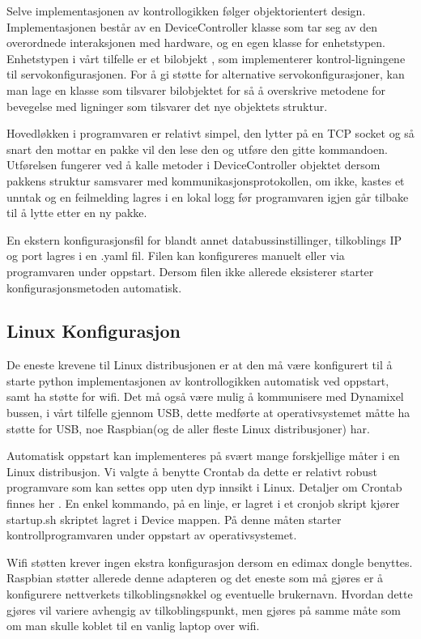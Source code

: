 \documentclass[12pt]{report}
\begin{document}
Selve implementasjonen av kontrollogikken følger objektorientert design. Implementasjonen består av en DeviceController klasse som tar seg av den overordnede interaksjonen med hardware, og en egen klasse for enhetstypen. Enhetstypen i vårt tilfelle er et bilobjekt , som implementerer kontrol-ligningene til servokonfigurasjonen. For å gi støtte for alternative servokonfigurasjoner, kan man lage en klasse som tilsvarer bilobjektet for så å overskrive metodene for bevegelse med ligninger som tilsvarer det nye objektets struktur.

Hovedløkken i programvaren er relativt simpel, den lytter på en TCP socket og så snart den mottar en pakke vil den lese den og utføre den gitte kommandoen. Utførelsen fungerer ved å kalle metoder i DeviceController objektet dersom pakkens struktur samsvarer med kommunikasjonsprotokollen, om ikke, kastes et unntak og en feilmelding lagres i en lokal logg før programvaren igjen går tilbake til å lytte etter en ny pakke.

En ekstern konfigurasjonsfil for blandt annet databussinstillinger, tilkoblings IP  og port lagres i en .yaml fil. Filen kan konfigureres manuelt eller via programvaren under oppstart. Dersom filen ikke allerede eksisterer starter konfigurasjonsmetoden automatisk.

\subsection{Linux Konfigurasjon}
De eneste krevene til Linux distribusjonen er at den må være konfigurert til å starte python implementasjonen av kontrollogikken automatisk ved oppstart, samt ha støtte for wifi. Det må også være mulig å kommunisere med Dynamixel bussen, i vårt tilfelle gjennom USB, dette medførte at operativsystemet måtte ha støtte for USB, noe Raspbian(og de aller fleste Linux distribusjoner) har.

Automatisk oppstart kan implementeres på svært mange forskjellige måter i en Linux distribusjon. Vi valgte å benytte Crontab da dette er relativt robust programvare som kan settes opp uten dyp innsikt i Linux. Detaljer om Crontab finnes her \cite{Crontab}. En enkel kommando, på en linje, er lagret i et cronjob skript kjører startup.sh skriptet lagret i Device mappen. På denne måten starter kontrollprogramvaren under oppstart av operativsystemet.

Wifi støtten krever ingen ekstra konfigurasjon dersom en edimax dongle benyttes. Raspbian støtter allerede denne adapteren og det eneste som må gjøres er å konfigurere nettverkets tilkoblingsnøkkel og eventuelle brukernavn. Hvordan dette gjøres vil variere avhengig av tilkoblingspunkt, men gjøres på samme måte som om man skulle koblet til en vanlig laptop over wifi.
\end{document}
